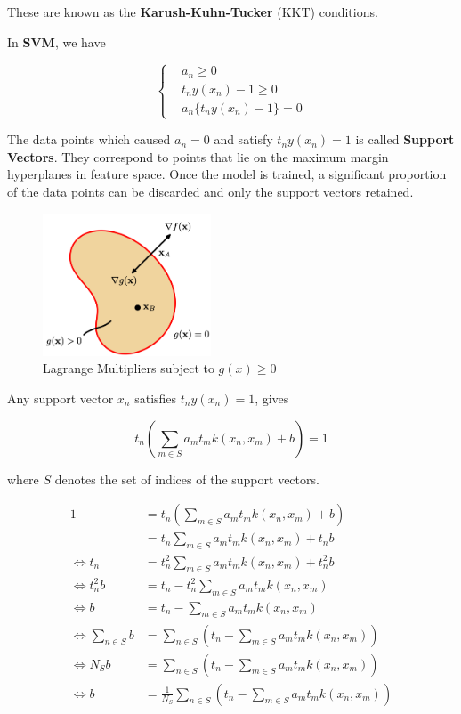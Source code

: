 These are known as the \textbf{Karush-Kuhn-Tucker} (KKT) conditions.

In \textbf{SVM}, we have

\begin{equation}
  \left\{
    \begin{aligned}
      & a_n \geq 0\\
      & t_n y(x_n) - 1 \geq 0\\
      & a_n \{t_n y (x_n) - 1\} = 0
    \end{aligned}
  \right.
\end{equation}

The data points which caused $a_n = 0$ and satisfy $t_n y(x_n) = 1$ is called \textbf{Support Vectors}. They correspond to points that lie on the maximum margin hyperplanes in feature space. Once the model is trained, a significant proportion of the data points can be discarded and only the support vectors retained.

\begin{figure}
    \centering
    \includegraphics[width=5cm]{chapter005/figures/fig004}
    \caption{Lagrange Multipliers subject to $g(x) \geq 0$}
\end{figure}

Any support vector $x_n$ satisfies $t_ny(x_n)=1$, gives

\begin{equation}
    t_n (\sum_{m \in S} a_m t_m k(x_n, x_m) + b) = 1
\end{equation}

where $S$ denotes the set of indices of the support vectors.

\begin{equation}
    \begin{split}
    1 & = t_n (\sum_{m \in S} a_m t_m k(x_n, x_m) + b) \\
    & = t_n \sum_{m \in S} a_m t_m k(x_n, x_m) + t_nb \\
    \Leftrightarrow t_n & = t_n^2 \sum_{m \in S} a_m t_m k(x_n, x_m) + t_n^2b\\
    \Leftrightarrow t_n^2b & = t_n - t_n^2 \sum_{m \in S} a_m t_m k(x_n, x_m)\\
    \Leftrightarrow b & = t_n - \sum_{m \in S} a_m t_m k(x_n, x_m)\\
    \Leftrightarrow \sum_{n \in S} b & = \sum_{n \in S} (t_n - \sum_{m \in S} a_m t_m k(x_n, x_m))\\
    \Leftrightarrow N_S b & = \sum_{n \in S} (t_n - \sum_{m \in S} a_m t_m k(x_n, x_m))\\
    \Leftrightarrow b & = \frac{1}{N_S}\sum_{n \in S} (t_n - \sum_{m \in S} a_m t_m k(x_n, x_m))\\
    \end{split}
\end{equation}

